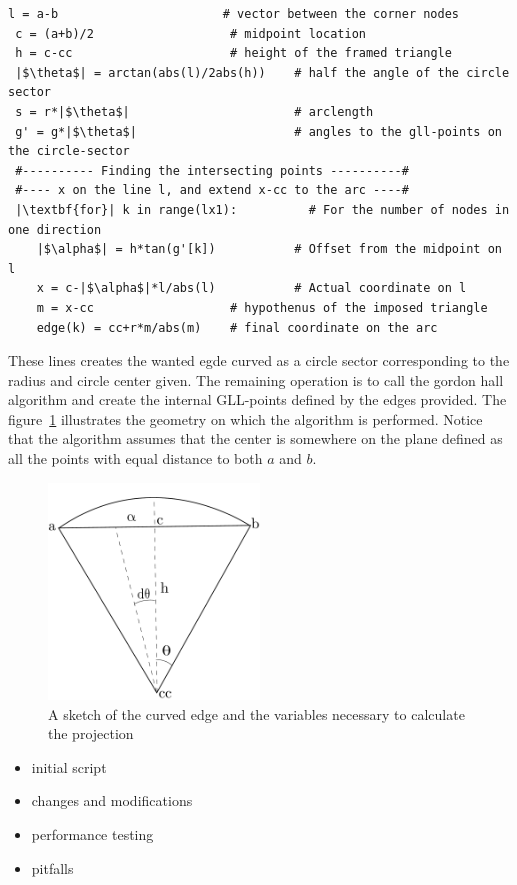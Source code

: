 \begingroup
\fontsize{12pt}{14pt}
\begin{lstlisting}[escapechar=|]
 l = a-b                       # vector between the corner nodes
 c = (a+b)/2                   # midpoint location
 h = c-cc                      # height of the framed triangle
 |$\theta$| = arctan(abs(l)/2abs(h))    # half the angle of the circle sector
 s = r*|$\theta$|                       # arclength
 g' = g*|$\theta$|                      # angles to the gll-points on the circle-sector
 #---------- Finding the intersecting points ----------#
 #---- x on the line l, and extend x-cc to the arc ----#
 |\textbf{for}| k in range(lx1):          # For the number of nodes in one direction
    |$\alpha$| = h*tan(g'[k])           # Offset from the midpoint on l
    x = c-|$\alpha$|*l/abs(l)           # Actual coordinate on l
    m = x-cc                   # hypothenus of the imposed triangle
    edge(k) = cc+r*m/abs(m)    # final coordinate on the arc
\end{lstlisting}
\endgroup
These lines creates the wanted egde curved as a circle sector corresponding to the radius and circle center given.
The remaining operation is to call the gordon hall algorithm and create the internal GLL-points defined by the edges 
provided. The figure~\ref{fig:curvature} illustrates the geometry on which the algorithm is performed.
Notice that the algorithm assumes that the center is somewhere on the plane defined as all the 
points with equal distance to both $a$ and $b$.


\begin{figure}[h]
    \centering
    \includegraphics[width = 0.5\textwidth]{Figures/curvature.pdf}
    \caption{A sketch of the curved edge and the variables necessary to calculate the projection}
    \label{fig:curvature}
\end{figure}


\begin{itemize}
	\item initial script
	\item changes and modifications
	\item performance testing
	\item pitfalls
\end{itemize}
